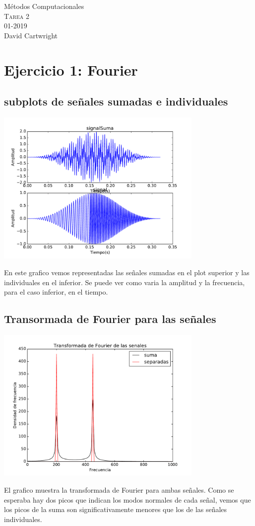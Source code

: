 \documentclass[11pt,letterpaper]{exam}
\begin{document}
\begin{center}
{\Large Métodos Computacionales} \\
\textsc{Tarea 2}\\
01-2019\\
David Cartwright\\
\end{center}

\noindent
\section{Ejercicio 1: Fourier}
\subsection{subplots de señales sumadas e individuales} 
\begin{center}
\includegraphics[width=10cm]{signal_subplots.pdf} 
\end{center}
En este grafico vemos representadas las señales sumadas en el plot superior y las individuales en el inferior. Se puede ver como varia la amplitud y la frecuencia, para el caso inferior, en el tiempo.

\subsection{Transormada de Fourier para las señales}
\begin{center}
\includegraphics[width=10cm]{Fourier_senales.pdf} 
\end{center}
El grafico muestra la transformada de Fourier para ambas señales. Como se esperaba hay dos picos que indican los modos normales de cada señal, vemos que los picos de la suma son significativamente menores que los de las señales individuales.
\end{document}

